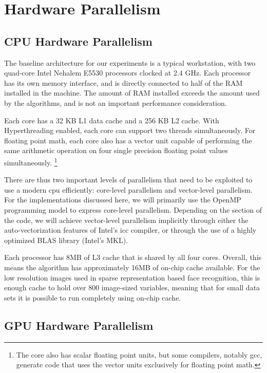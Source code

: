 \documentclass[10pt,twocolumn,letterpaper]{article}
\begin{document}
\section{Hardware Parallelism} 

\subsection{CPU Hardware Parallelism} 
The baseline architecture for our experiments is a typical workstation,
with two quad-core Intel Nehalem E5530 processors clocked at 2.4 GHz.  Each
processor has its own memory interface, and is directly connected to half of
the RAM installed in the machine.  The amount of RAM installed exceeds the
amount used by the algorithms, and is not an important performance
consideration.  

Each core has a 32 KB L1 data cache and a 256 KB L2 cache. With Hyperthreading
enabled, each core can support two threads simultaneously.  For floating point
math, each core also has a vector unit capable of performing the same
arithmetic operation on four single precision floating point values
simultaneously.  \footnote{The core also has scalar floating point units, but
some compilers, notably gcc, generate code that uses the vector units
exclusively for floating point math.} 

There are thus two important levels of parallelism that need to be exploited to
use a modern cpu efficiently: core-level parallelism and vector-level
parallelism.  For the implementations discussed here, we will primarily use the
OpenMP programming model to express core-level parallelism.  Depending on the
section of the code, we will achieve vector-level parallelism implicitly
through either the auto-vectorization features of Intel's icc compiler, or
through the use of a highly optimized BLAS library (Intel's MKL).

Each processor has 8MB of L3 cache that is shared by all four cores.  Overall,
this means the algorithm has approximately 16MB of on-chip cache available.
For the low resolution images used in sparse representation based face
recognition, this is enough cache to hold over 800 image-sized variables,
meaning that for small data sets it is possible to run completely using on-chip
cache.

\subsection{GPU Hardware Parallelism}
\end{document}
